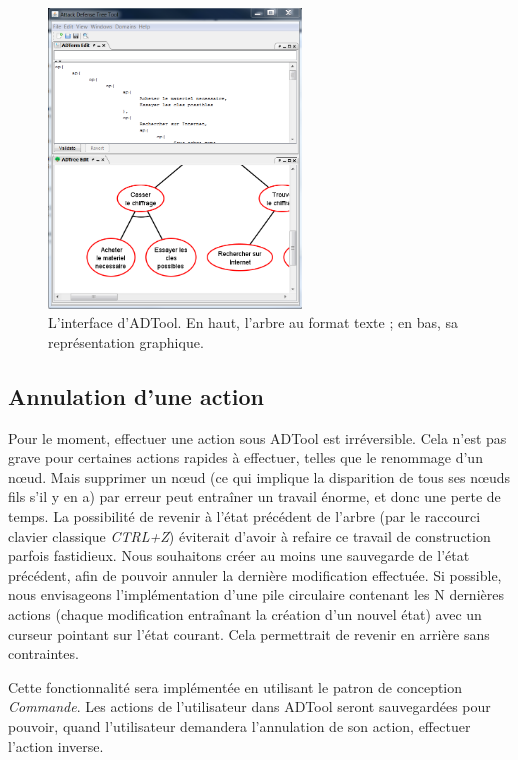         \begin{figure}[h]
            \centering
            \includegraphics[width=0.6\textwidth]{figure/interface_adtool.png}
            \caption{L'interface d'ADTool. En haut, l'arbre au format texte ; en bas, sa représentation graphique.}
            \label{fig:int_adTool}
        \end{figure}
    
    \subsection{Annulation d'une action}    
        Pour le moment, effectuer une action sous ADTool est irréversible. Cela n'est pas grave pour certaines actions rapides à effectuer, telles que le renommage d'un nœud. Mais supprimer un nœud (ce qui implique la disparition de tous ses nœuds fils s'il y en a) par erreur peut entraîner un travail énorme, et donc une perte de temps. La possibilité de revenir à l'état précédent de l'arbre (par le raccourci clavier classique \emph{CTRL+Z}) éviterait d'avoir à refaire ce travail de construction parfois fastidieux. Nous souhaitons créer au moins une sauvegarde de l'état précédent, afin de pouvoir annuler la dernière modification effectuée. Si possible, nous envisageons l'implémentation d'une pile circulaire contenant les N dernières actions (chaque modification entraînant la création d'un nouvel état) avec un curseur pointant sur l'état courant. Cela permettrait de revenir en arrière sans contraintes. 

        Cette fonctionnalité sera implémentée en utilisant le patron de conception \emph{Commande}. Les actions de l'utilisateur dans ADTool seront sauvegardées pour pouvoir, quand l'utilisateur demandera l'annulation de son action, effectuer l'action inverse. 

